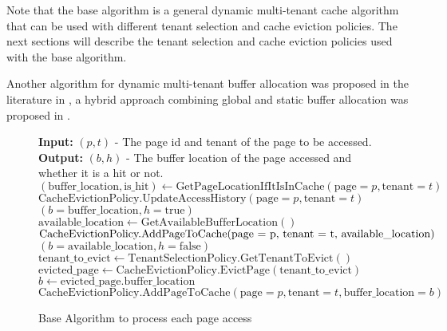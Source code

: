 Note that the base algorithm is a general dynamic multi-tenant cache algorithm that can 
be used with different tenant selection and cache eviction policies. The next sections 
will describe the tenant selection and cache eviction policies used with the base algorithm.

Another algorithm for dynamic multi-tenant buffer allocation was proposed in the 
literature in \cite{buffer-sharing-1}, a hybrid approach combining global and static 
buffer allocation was proposed in \cite{article-for-2level-forecasting}.

\begin{figure}[htbp]
    \centering
    \begin{minipage}{\linewidth}
    \begin{algorithm}[H]
        \caption{Base Algorithm to process each page access}
        \begin{algorithmic}
            \STATE \textbf{Input:} $(p, t)$ - The page id and tenant of the page to be accessed.
            \STATE \textbf{Output:} $(b, h)$ - The buffer location of the page accessed and whether it is a hit or not.
            \STATE
            \STATE $(\text{buffer\_location}, \text{is\_hit}) \leftarrow \text{GetPageLocationIfItIsInCache}(\text{page} = p, \text{tenant} = t)$
                \STATE $\text{CacheEvictionPolicy.UpdateAccessHistory}(\text{page} = p, \text{tenant} = t)$
                \RETURN $(b = \text{buffer\_location}, h = \text{true})$
            \ELSE
                \STATE {}
                    \STATE $\text{available\_location} \leftarrow \text{GetAvailableBufferLocation}()$ 
                    \STATE $\text{CacheEvictionPolicy.AddPageToCache(\text{page} = p, \text{tenant} = t, \text{available\_location})}$
                    \RETURN $(b = \text{available\_location}, h = \text{false})$
                \ELSE
                    \STATE {}
                    \STATE $\text{tenant\_to\_evict} \leftarrow \text{TenantSelectionPolicy.GetTenantToEvict}()$
                    \STATE $\text{evicted\_page} \leftarrow \text{CacheEvictionPolicy.EvictPage}(\text{tenant\_to\_evict})$
                    \STATE $b \leftarrow \text{evicted\_page.buffer\_location}$
                    \STATE $\text{CacheEvictionPolicy.AddPageToCache}(\text{page} = p, \text{tenant} = t, \text{buffer\_location} = b)$

\end{algorithmic}
\end{algorithm}
\end{minipage}
\end{figure}
